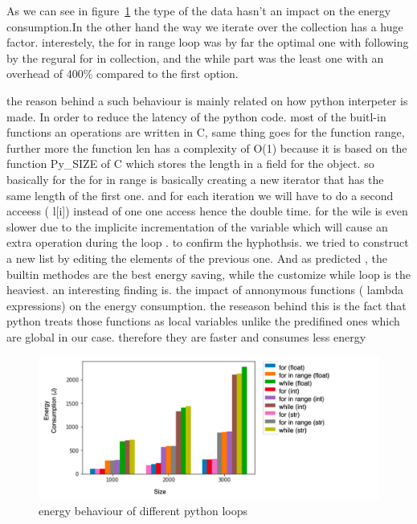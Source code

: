 As we can see in figure~\ref{fig:pythonloops} the type of the data hasn't an impact on the energy consumption.In the other hand the way we iterate over the collection has a huge factor. interestely, the for in range loop was by far the optimal one with following by the regural for in collection, and the while part was the least one with an overhead of 400\% compared to the first option.



the reason behind a such behaviour is mainly related on how python interpeter is made.
In order to reduce the latency of the python code. most of the buitl-in functions an operations are written in C, same thing goes for the function range, further more the function len has a complexity of O(1) because it is based on the function Py\_SIZE  of C which stores the length in a field for the object.
so basically for the for in range is basically creating a new iterator that has the same length of the first one. and for each iteration we will have to do a second acceess ( l[i]) instead of one one access hence the double time.
for the wile is even slower due to the implicite incrementation of the variable which will cause an extra operation during the loop .
to confirm the hyphothsis. we tried to construct a new list by editing the elements of the previous one. And as predicted , the builtin methodes are the best energy saving, while the customize while loop is the heaviest. an interesting finding is. the impact of annonymous functions ( lambda expressions) on the energy consumption.
the reseason behind this is the fact that python treats those functions as local variables unlike the predifined ones which are global in our case. therefore they are faster and consumes less energy  %

\begin{figure}
    \centering
    \includegraphics[width=\linewidth]{imgs/python_iterations}
    \caption{energy behaviour of different python loops }
    \label{fig:pythonloops}
\end{figure}


